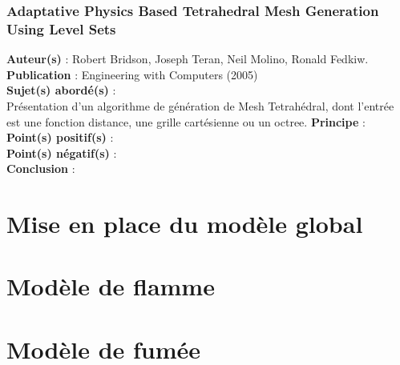 \documentclass[a4paper,10pt]{article}
\begin{document}
\subsubsection{Adaptative Physics Based Tetrahedral Mesh Generation Using Level Sets}
\textbf{Auteur(s)} : Robert Bridson, Joseph Teran, Neil Molino, Ronald Fedkiw.\\
\textbf{Publication} : Engineering with Computers (2005)\\
\textbf{Sujet(s) abordé(s)} : \\
	Présentation d'un algorithme de génération de Mesh Tetrahédral, dont l'entrée est une fonction distance, une grille cartésienne ou un octree.
\textbf{Principe} :\\	
\textbf{Point(s) positif(s)} :\\
\textbf{Point(s) négatif(s)} :\\
\textbf{Conclusion} :\\









\section{Mise en place du modèle global}




\section{Modèle de flamme}





\section{Modèle de fumée}





\end{document}
